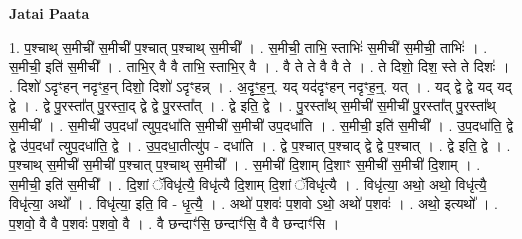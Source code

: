 \documentclass[17pt]{extarticle}
\begin{document}
\textbf{Jatai Paata} \newline

1. प॒श्चाथ् स॒मीची॑ स॒मीची॑ प॒श्चात् प॒श्चाथ् स॒मीची᳚ । . स॒मीची॒ ताभि॒ स्ताभिः॑ स॒मीची॑ स॒मीची॒ ताभिः॑ । . स॒मीची॒ इति॑ स॒मीची᳚ । . ताभि॒र् वै वै ताभि॒ स्ताभि॒र् वै । . वै ते ते वै वै ते । . ते दिशो॒ दिश॒ स्ते ते दिशः॑ । . दिशो॑ ऽदृꣳहन् नदृꣳह॒न् दिशो॒ दिशो॑ ऽदृꣳहन्न् । . अ॒दृꣳ॒॒ह॒न्॒. यद् यद॑दृꣳहन् नदृꣳह॒न्॒. यत् । . यद् द्वे द्वे यद् यद् द्वे । . द्वे पु॒रस्ता᳚त् पु॒रस्ता॒द् द्वे द्वे पु॒रस्ता᳚त् । . द्वे इति॒ द्वे । . पु॒रस्ता᳚थ् स॒मीची॑ स॒मीची॑ पु॒रस्ता᳚त् पु॒रस्ता᳚थ् स॒मीची᳚ । . स॒मीची॑ उप॒दधा᳚ त्युप॒दधा॑ति स॒मीची॑ स॒मीची॑ उप॒दधा॑ति । . स॒मीची॒ इति॑ स॒मीची᳚ । . उ॒प॒दधा॑ति॒ द्वे द्वे उ॑प॒दधा᳚ त्युप॒दधा॑ति॒ द्वे । . उ॒प॒दधा॒तीत्यु॑प - दधा॑ति । . द्वे प॒श्चात् प॒श्चाद् द्वे द्वे प॒श्चात् । . द्वे इति॒ द्वे । . प॒श्चाथ् स॒मीची॑ स॒मीची॑ प॒श्चात् प॒श्चाथ् स॒मीची᳚ । . स॒मीची॑ दि॒शाम् दि॒शाꣳ स॒मीची॑ स॒मीची॑ दि॒शाम् । . स॒मीची॒ इति॑ स॒मीची᳚ । . दि॒शां ॅविधृ॑त्यै॒ विधृ॑त्यै दि॒शाम् दि॒शां ॅविधृ॑त्यै । . विधृ॑त्या॒ अथो॒ अथो॒ विधृ॑त्यै॒ विधृ॑त्या॒ अथो᳚ । . विधृ॑त्या॒ इति॒ वि - धृ॒त्यै॒ । . अथो॑ प॒शवः॑ प॒शवो ऽथो॒ अथो॑ प॒शवः॑ । . अथो॒ इत्यथो᳚ । . प॒शवो॒ वै वै प॒शवः॑ प॒शवो॒ वै । . वै छन्दाꣳ॑सि॒ छन्दाꣳ॑सि॒ वै वै छन्दाꣳ॑सि । \newline
\end{document}
